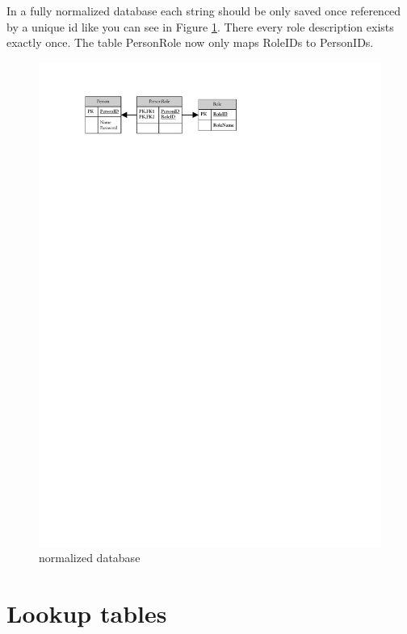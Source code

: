 		In a fully normalized database each string should be only saved once 
		referenced by a unique id like you can see in Figure \ref{fig:AnalysisEnumNew}. 
		There every role description exists exactly once. The table PersonRole now 
		only maps RoleIDs to PersonIDs.

		\begin{figure}[hbt]
			\begin{center}
				\includegraphics{./files/inc/figures/AnalysisEnumNew}
				\caption{\label{fig:AnalysisEnumNew} normalized database}
			\end{center}
		\end{figure}
	
	
	\section{Lookup tables}

